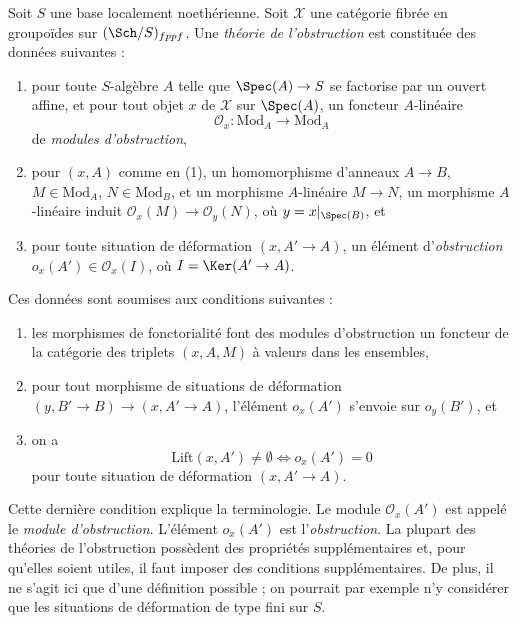 \begin{definition}
\label{definition-obstruction-theory}
Soit $S$ une base localement noethérienne. Soit $\mathcal{X}$ une catégorie fibrée
en groupoïdes sur $(\Sch/S)_{fppf}$. Une {\it théorie de l'obstruction} est
constituée des données suivantes :
\begin{enumerate}
\item pour toute $S$-algèbre $A$ telle que $\Spec(A) \to S$
se factorise par un ouvert affine, et pour tout objet $x$ de $\mathcal{X}$ sur
$\Spec(A)$, un foncteur $A$-linéaire
$$
\mathcal{O}_x : \text{Mod}_A \to \text{Mod}_A
$$
de {\it modules d'obstruction},
\item pour $(x, A)$ comme en (1), un homomorphisme d'anneaux $A \to B$,
$M \in \text{Mod}_A$, $N \in \text{Mod}_B$, et un morphisme $A$-linéaire
$M \to N$, un morphisme $A$-linéaire induit $\mathcal{O}_x(M) \to \mathcal{O}_y(N)$,
où $y = x|_{\Spec(B)}$, et
\item pour toute situation de déformation $(x, A' \to A)$, un
élément d'{\it obstruction}
$o_x(A') \in \mathcal{O}_x(I)$, où $I = \Ker(A' \to A)$.
\end{enumerate}
Ces données sont soumises aux conditions suivantes :
\begin{enumerate}
\item[(i)] les morphismes de fonctorialité font des modules d'obstruction un foncteur
de la catégorie des triplets $(x, A, M)$ à valeurs dans les ensembles,
\item[(ii)] pour tout morphisme de situations de déformation
$(y, B' \to B) \to (x, A' \to A)$, l'élément $o_x(A')$ s'envoie
sur $o_y(B')$, et
\item[(iii)] on a
$$
\text{Lift}(x, A') \not = \emptyset
\Leftrightarrow
o_x(A') = 0
$$
pour toute situation de déformation $(x, A' \to A)$.
\end{enumerate}
\end{definition}

\noindent
Cette dernière condition explique la terminologie. Le module $\mathcal{O}_x(A')$
est appelé le {\it module d'obstruction}. L'élément $o_x(A')$ est
l'{\it obstruction}.
La plupart des théories de l'obstruction possèdent des propriétés supplémentaires et,
pour qu'elles soient utiles, il faut imposer des conditions supplémentaires.
De plus, il ne s'agit ici que d'une définition possible ; on pourrait par exemple
n'y considérer que les situations de déformation de type fini sur $S$.

